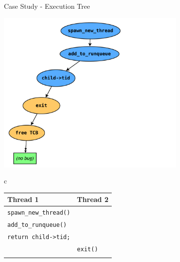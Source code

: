 \documentclass[xcolor=dvipsnames]{beamer}
\begin{document}
\begin{frame}{Case Study - Execution Tree}
	\begin{center}
		\includegraphics[width=0.7\textwidth]{threadfork0.pdf}
		\hspace{-0.5in} {\tiny 
		\begin{tabular}{c}
			\begin{tabular}{|l|l|}
				\hline
				\cellcolor{thread1} {\bf Thread 1} & \cellcolor{thread2} {\bf Thread 2} \\
				\hline
				{\tt spawn\_new\_thread()} & \\
				\hline
				{\tt add\_to\_runqueue()} & \\
				\hline
				{\tt return child->tid;} & \\
				\hline
				& {\tt exit()} \\
				\hline
				& {\tt <free TCB>} \\
				\hline
			\end{tabular}
			\\ \\ \\ \\ \\ \\ \\ \\
			\\ \\ \\ \\ \\ \\ \\ \\
			\\ \\ \\ \\ \\ \\ \\ \\

\end{tabular}}
\end{center}
\end{frame}
\end{document}
